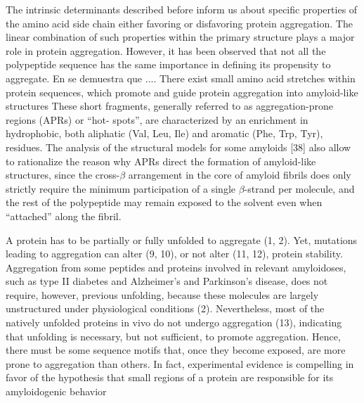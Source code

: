 The intrinsic determinants described before inform us about specific properties of the amino acid side chain either favoring or disfavoring protein aggregation.
The linear combination of such properties within the primary structure plays a
major role in protein aggregation. However, it has been observed that not all
the polypeptide sequence has the same importance in defining its propensity to
aggregate. En \cite{ventura2004short} se demuestra que ....
There exist small amino acid stretches within protein sequences, which
promote and guide protein aggregation into amyloid-like structures
These short fragments, generally referred to as aggregation-prone regions (APRs) or “hot-
spots”, are characterized by an enrichment in hydrophobic, both aliphatic (Val, Leu,
Ile) and aromatic (Phe, Trp, Tyr), residues.
The analysis of the structural models for some amyloids [38] also allow to rationalize the reason why APRs direct the
formation of amyloid-like structures, since the cross-$\beta$ arrangement in the core of
amyloid fibrils does only strictly require the minimum participation of a single $\beta$-strand per molecule, and the rest of the polypeptide may remain exposed to the
solvent even when “attached” along the fibril.


A protein has to be partially or fully unfolded to aggregate (1, 2).
Yet, mutations leading to aggregation can alter (9, 10), or not alter (11, 12), protein stability. 
Aggregation from some peptides and proteins involved in relevant amyloidoses, such as type II diabetes and Alzheimer’s and Parkinson’s disease, does not require, however, previous unfolding, because these molecules are largely
unstructured under physiological conditions (2). 
Nevertheless, most of the natively unfolded proteins in vivo do not undergo aggregation (13), indicating that unfolding is necessary, but not sufficient, to promote aggregation. 
Hence, there must be some sequence motifs that, once they become exposed, are more prone to aggregation than others. 
In fact, experimental evidence is compelling in favor of the hypothesis that small regions of a protein are responsible for its amyloidogenic behavior




